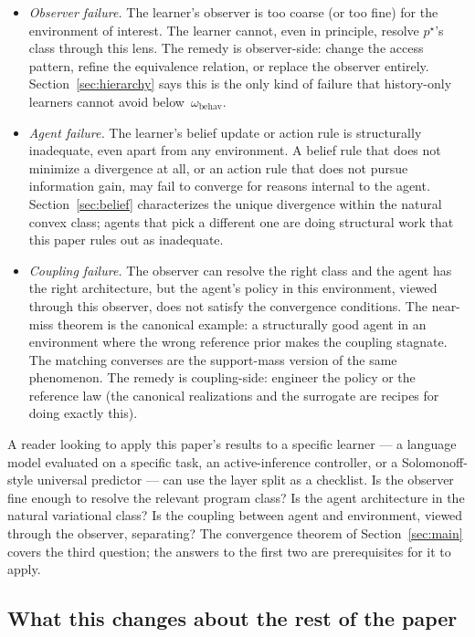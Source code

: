 \begin{itemize}
\item \emph{Observer failure.} The learner's observer is too coarse (or too fine) for the environment of interest. The learner cannot, even in principle, resolve $p^\star$'s class through this lens. The remedy is observer-side: change the access pattern, refine the equivalence relation, or replace the observer entirely. Section~\ref{sec:hierarchy} says this is the only kind of failure that history-only learners cannot avoid below~$\omega_{\mathrm{behav}}$.
\item \emph{Agent failure.} The learner's belief update or action rule is structurally inadequate, even apart from any environment. A belief rule that does not minimize a divergence at all, or an action rule that does not pursue information gain, may fail to converge for reasons internal to the agent. Section~\ref{sec:belief} characterizes the unique divergence within the natural convex class; agents that pick a different one are doing structural work that this paper rules out as inadequate.
\item \emph{Coupling failure.} The observer can resolve the right class and the agent has the right architecture, but the agent's policy in this environment, viewed through this observer, does not satisfy the convergence conditions. The near-miss theorem is the canonical example: a structurally good agent in an environment where the wrong reference prior makes the coupling stagnate. The matching converses are the support-mass version of the same phenomenon. The remedy is coupling-side: engineer the policy or the reference law (the canonical realizations and the surrogate are recipes for doing exactly this).
\end{itemize}

A reader looking to apply this paper's results to a specific learner --- a language model evaluated on a specific task, an active-inference controller, or a Solomonoff-style universal predictor --- can use the layer split as a checklist. Is the observer fine enough to resolve the relevant program class? Is the agent architecture in the natural variational class? Is the coupling between agent and environment, viewed through the observer, separating? The convergence theorem of Section~\ref{sec:main} covers the third question; the answers to the first two are prerequisites for it to apply.

\subsection{What this changes about the rest of the paper}
\label{sec:ontology-roadmap}

